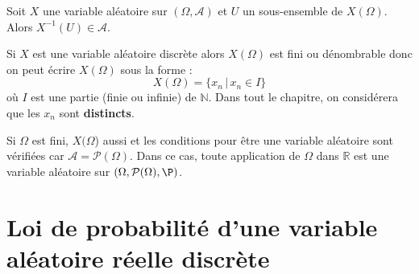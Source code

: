 \documentclass[a4paper,10pt]{report}
\begin{document}
\begin{prop} Soit $X$ une variable aléatoire sur $(\Omega, \mathcal{A})$ et $U$ un sous-ensemble de $X(\Omega)$. Alors $X^{-1}(U) \in \mathcal{A}$.
\end{prop}


\begin{rems}
\item Si $X$ est une variable aléatoire discrète alors $X(\Omega)$ est fini ou dénombrable donc on peut écrire $X(\Omega)$ sous la forme :
$$ X(\Omega) = \lbrace x_n \, \vert \, x_n \in I \rbrace$$
où $I$ est une partie (finie ou infinie) de $\mathbb{N}$. Dans tout le chapitre, on considérera que les $x_n$ sont \textbf{distincts}.
\item Si $\Omega$ est fini, $X(\Omega$) aussi et les conditions pour être une variable aléatoire sont vérifiées car $\mathcal{A}= \mathcal{P}(\Omega)$. Dans ce cas, toute application de $\Omega$ dans $\mathbb{R}$  est une variable aléatoire sur $(\Omega, \mathcal{P}(\Omega), \P)$.
\end{rems}


%
%

\section{Loi de probabilité d'une variable aléatoire réelle discrète}
\end{document}
